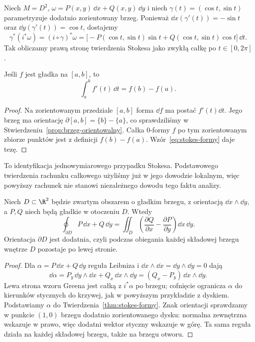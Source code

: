 \begin{przyklad}
Niech $M=D^2$, $\omega=P(x,y)\,\dd x+Q(x,y)\,\dd y$
i niech $\gamma(t)=(\cos t,\sin t)$ parametryzuje
dodatnio zorientowany brzeg. Ponieważ
$\dd x(\gamma'(t))=-\sin t$ oraz
$\dd y(\gamma'(t))=\cos t$, dostajemy
\[
 \gamma^*(i^*\omega)
 =(i\circ\gamma)^*\omega
 =\bigl[-P(\cos t,\sin t)\sin t
       +Q(\cos t,\sin t)\cos t\bigr]\,\dd t.
\]
Tak obliczamy prawą stronę twierdzenia Stokesa
jako zwykłą całkę po $t\in[0,2\pi]$.
\end{przyklad}

\begin{wniosek}
\label{cor:stokes-ftc}
Jeśli $f$ jest gładka na $[a,b]$, to
\[
 \int_a^b f'(t)\,\dd t=f(b)-f(a).
\]
\end{wniosek}
\begin{proof}
Na zorientowanym przedziale $[a,b]$ forma $\dd f$
ma postać $f'(t)\dd t$. Jego brzeg ma orientację
$\partial[a,b]=\{b\}-\{a\}$, co sprawdziliśmy
w Stwierdzeniu~\ref{prop:brzeg-orientowalny}.
Całka $0$-formy $f$ po tym zorientowanym
zbiorze punktów jest z definicji $f(b)-f(a)$.
Wzór~\eqref{eq:stokes-formy} daje tezę.
\end{proof}
To identyfikacja jednowymiarowego przypadku Stokesa.
Podstawowego twierdzenia rachunku całkowego użyliśmy
już w jego dowodzie lokalnym, więc powyższy rachunek
nie stanowi niezależnego dowodu tego faktu analizy.

\begin{wniosek}
\label{cor:stokes-green}
Niech $D\subset\R^2$ będzie zwartym obszarem
o gładkim brzegu, z orientacją $\dd x\wedge\dd y$,
a $P,Q$ niech będą gładkie w otoczeniu $D$. Wtedy
\[
 \oint_{\partial D}P\,\dd x+Q\,\dd y
 =\iint_D\left(\frac{\partial Q}{\partial x}
             -\frac{\partial P}{\partial y}\right)
       \dd x\,\dd y.
\]
Orientacja $\partial D$ jest dodatnia, czyli
podczas obiegania każdej składowej brzegu
wnętrze $D$ pozostaje po lewej stronie.
\end{wniosek}
\begin{proof}
Dla $\alpha=P\,\dd x+Q\,\dd y$ reguła
Leibniza i $\dd x\wedge\dd x
=\dd y\wedge\dd y=0$ dają
\[
 \dd\alpha
 =P_y\,\dd y\wedge\dd x
  +Q_x\,\dd x\wedge\dd y
 =(Q_x-P_y)\,\dd x\wedge\dd y.
\]
Lewa strona wzoru Greena jest całką z
$i^*\alpha$ po brzegu; cofnięcie ogranicza
$\alpha$ do kierunków stycznych do krzywej,
jak w powyższym przykładzie z dyskiem. Podstawiamy $\alpha$ do
Twierdzenia~\ref{thm:stokes-formy}.
Znak orientacji sprawdzamy w punkcie
$(1,0)$ brzegu dodatnio zorientowanego dysku:
normalna zewnętrzna wskazuje w prawo, więc
dodatni wektor styczny wskazuje w górę.
Ta sama reguła działa na każdej składowej
brzegu, także na brzegu otworu.
\end{proof}

